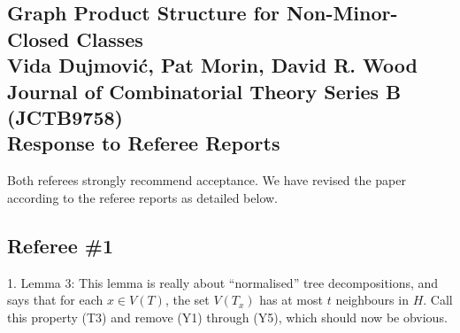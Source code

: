 \documentclass[12pt]{article}
\begin{document}
\subsection*{Graph Product Structure for Non-Minor-Closed Classes\\
Vida Dujmovi\'c, Pat Morin, David R. Wood\\
Journal of Combinatorial Theory Series B (JCTB9758)\\
Response to Referee Reports}

Both referees strongly recommend acceptance. We have revised the paper according to the referee reports as detailed below. 

\subsection*{Referee \#1}

%
%
%


1. Lemma 3: This lemma is really about ``normalised'' tree decompositions, and says that for each $x \in V(T)$, the set $V(T_x)$ has at most $t$ neighbours in $H$. Call this property (T3) and remove (Y1)  through (Y5), which should now be obvious.
\end{document}
